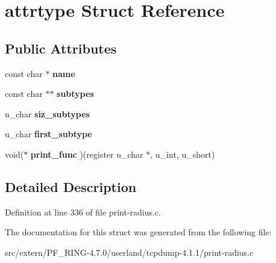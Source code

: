 \hypertarget{structattrtype}{
\section{attrtype Struct Reference}
\label{structattrtype}
}
\subsection*{Public Attributes}
\begin{DoxyCompactItemize}
\item 
\hypertarget{structattrtype_ae3a14c6d576c4d3070e11cbe5e49c4c7}{
const char $\ast$ {\bfseries name}}
\label{structattrtype_ae3a14c6d576c4d3070e11cbe5e49c4c7}

\item 
\hypertarget{structattrtype_aabe5506f7fda5c5c7be38510216e7b5d}{
const char $\ast$$\ast$ {\bfseries subtypes}}
\label{structattrtype_aabe5506f7fda5c5c7be38510216e7b5d}

\item 
\hypertarget{structattrtype_a57d8889acaa15b6be27f8e090eb68001}{
u\_\-char {\bfseries siz\_\-subtypes}}
\label{structattrtype_a57d8889acaa15b6be27f8e090eb68001}

\item 
\hypertarget{structattrtype_a09db2aba581b18f9f93988ce0d1e9c5d}{
u\_\-char {\bfseries first\_\-subtype}}
\label{structattrtype_a09db2aba581b18f9f93988ce0d1e9c5d}

\item 
\hypertarget{structattrtype_afd85064d003d0240bffbdf3e8121d085}{
void($\ast$ {\bfseries print\_\-func} )(register u\_\-char $\ast$, u\_\-int, u\_\-short)}
\label{structattrtype_afd85064d003d0240bffbdf3e8121d085}

\end{DoxyCompactItemize}


\subsection{Detailed Description}


Definition at line 336 of file print-\/radius.c.



The documentation for this struct was generated from the following file:\begin{DoxyCompactItemize}
\item 
src/extern/PF\_\-RING-\/4.7.0/userland/tcpdump-\/4.1.1/print-\/radius.c\end{DoxyCompactItemize}
